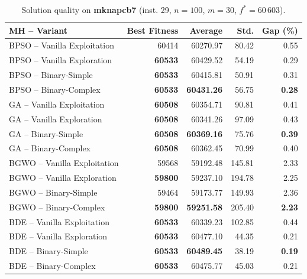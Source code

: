 \documentclass[journal,article,submit,moreauthors]{Definitions/mdpi}
\begin{document}
\begin{table}[htbp]
  \centering
  \small
  \caption{Solution quality on \textbf{mknapcb7} (inst. 29, $n=100$, $m=30$, $f^*=60\,603$).}
  \label{tab:calidad_mknapcb7_29}
  \begin{tabular}{lrrrr}
    \toprule
    \textbf{MH -- Variant} &
    \textbf{Best Fitness} &
    \textbf{Average} &
    \textbf{Std.} &
    \textbf{Gap (\%)} \\
    \midrule
    BPSO -- Vanilla Exploitation &          60414 &         60270.97 &  80.42 &         0.55 \\
    BPSO -- Vanilla Exploration  & \textbf{60533} &         60429.52 &  54.19 &         0.29 \\
    BPSO -- Binary-Simple        & \textbf{60533} &         60415.81 &  50.91 &         0.31 \\
    BPSO -- Binary-Complex       & \textbf{60533} & \textbf{60431.26} &  56.75 & \textbf{0.28} \\
    \midrule
    GA -- Vanilla Exploitation   & \textbf{60508} &         60354.71 &  90.81 &         0.41 \\
    GA -- Vanilla Exploration    & \textbf{60508} &         60341.26 &  97.09 &         0.43 \\
    GA -- Binary-Simple          & \textbf{60508} & \textbf{60369.16} &  75.76 & \textbf{0.39} \\
    GA -- Binary-Complex         & \textbf{60508} &         60362.45 &  70.99 &         0.40 \\
    \midrule
    BGWO -- Vanilla Exploitation &          59568 &         59192.48 & 145.81 &         2.33 \\
    BGWO -- Vanilla Exploration  & \textbf{59800} &         59237.10 & 194.78 &         2.25 \\
    BGWO -- Binary-Simple        &          59464 &         59173.77 & 149.93 &         2.36 \\
    BGWO -- Binary-Complex       & \textbf{59800} & \textbf{59251.58} & 205.40 & \textbf{2.23} \\
    \midrule
    BDE -- Vanilla Exploitation  & \textbf{60533} &         60339.23 & 102.85 &         0.44 \\
    BDE -- Vanilla Exploration   & \textbf{60533} &         60477.10 &  44.35 &         0.21 \\
    BDE -- Binary-Simple         & \textbf{60533} & \textbf{60489.45} &  38.19 & \textbf{0.19} \\
    BDE -- Binary-Complex        & \textbf{60533} &         60475.77 &  45.03 &         0.21 \\
    \bottomrule
  \end{tabular}
\end{table}
\end{document}
